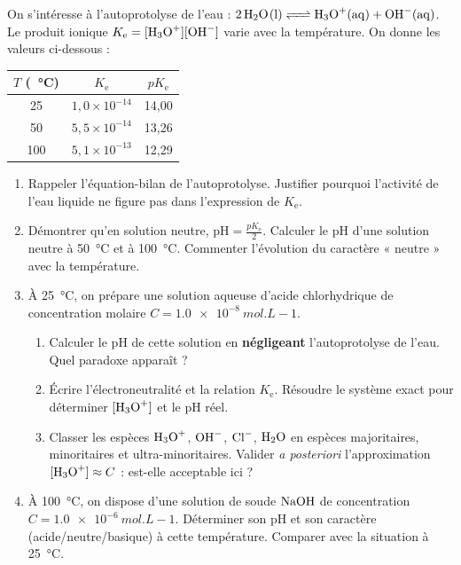 \documentclass[11pt]{article}
\begin{document}
\begin{exercice}
On s'intéresse à l'autoprotolyse de l'eau : $\ce{2H2O(l) <=> H3O+(aq) + OH-(aq)}$. Le produit ionique $K_{\text{e}} = [\ce{H3O+}][\ce{OH-}]$ varie avec la température. On donne les valeurs ci-dessous :

\begin{center}
\begin{tabular}{c|c|c}
$T$ (\SI{}{\celsius}) & $K_{\text{e}}$ & $pK_{\text{e}}$ \\
\hline
25 & $1,0 \times 10^{-14}$ & 14,00 \\
50 & $5,5 \times 10^{-14}$ & 13,26 \\
100 & $5,1 \times 10^{-13}$ & 12,29
\end{tabular}
\end{center}

\begin{enumerate}
    \item Rappeler l'équation-bilan de l'autoprotolyse. Justifier pourquoi l'activité de l'eau liquide ne figure pas dans l'expression de $K_{\text{e}}$.
    \item Démontrer qu'en solution neutre, $\text{pH} = \frac{pK_{\text{e}}}{2}$. Calculer le pH d'une solution neutre à \SI{50}{\celsius} et à \SI{100}{\celsius}. Commenter l'évolution du caractère « neutre » avec la température.
    \item À \SI{25}{\celsius}, on prépare une solution aqueuse d'acide chlorhydrique de concentration molaire $C = \SI{1,0e-8}{mol.L-1}$.
    \begin{enumerate}
        \item Calculer le pH de cette solution en \textbf{négligeant} l'autoprotolyse de l'eau. Quel paradoxe apparaît ?
        \item Écrire l'électroneutralité et la relation $K_{\text{e}}$. Résoudre le système exact pour déterminer $[\ce{H3O+}]$ et le pH réel.
        \item Classer les espèces $\ce{H3O+}$, $\ce{OH-}$, $\ce{Cl-}$, $\ce{H2O}$ en espèces majoritaires, minoritaires et ultra-minoritaires. Valider \textit{a posteriori} l'approximation $[\ce{H3O+}] \approx C$ : est-elle acceptable ici ?
    \end{enumerate}
    \item À \SI{100}{\celsius}, on dispose d'une solution de soude $\ce{NaOH}$ de concentration $C = \SI{1,0e-6}{mol.L-1}$. Déterminer son pH et son caractère (acide/neutre/basique) à cette température. Comparer avec la situation à \SI{25}{\celsius}.
\end{enumerate}
\end{exercice}
\end{document}
